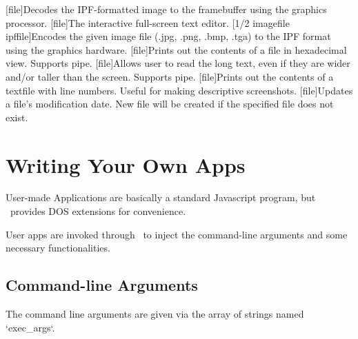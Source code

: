 \begin{outline}
\1
\1
\1
\1
\1[file]{Decodes the IPF-formatted image to the framebuffer using the graphics processor.}
\1
\1[file]{The interactive full-screen text editor.}
\1[1/2 imagefile ipffile]{Encodes the given image file (.jpg, .png, .bmp, .tga) to the IPF format using the graphics hardware.}
\1
\1[file]{Prints out the contents of a file in hexadecimal view. Supports pipe.}
\1[file]{Allows user to read the long text, even if they are wider and/or taller than the screen. Supports pipe.}
\1[file]{Prints out the contents of a textfile with line numbers. Useful for making descriptive screenshots.}
\1[file]{Updates a file's modification date. New file will be created if the specified file does not exist.}
\1
\end{outline}



\chapter{Writing Your Own Apps}

User-made Applications are basically a standard Javascript program, but \thedos\ provides DOS extensions for convenience.

User apps are invoked through \thedos\ to inject the command-line arguments and some necessary functionalities.

\section{Command-line Arguments}

The command line arguments are given via the array of strings named `exec\_args`.

